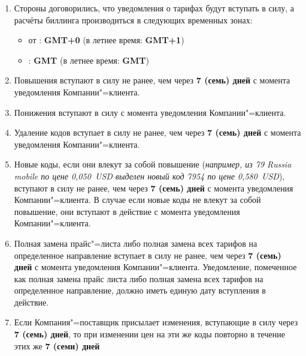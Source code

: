 \begin{Form}
  \begin{enumerate}[label=\thesection.\arabic*.]
    \item Стороны договорились, что уведомления о тарифах будут вступать в силу, а расчёты биллинга производиться в следующих временных зонах:
      \begin{itemize}
        \item от \textbf{\ipxpname}: \textbf{GMT+0} (в летнее время: \textbf{GMT+1})
        \item {}
                {\underline{\TextField[name=clntname,charsize=10pt,width=22em,height=1em,borderwidth=0, bordercolor={1 1 1}, default=Company name]{}}:}
                 \textbf{GMT}\underline{\TextField[name=clntgmt,charsize=10pt,width=3em,maxlen=3,height=1em,borderwidth=0,bordercolor={1 1 1}]{}}
         (в летнее время: \textbf{GMT}\underline{\TextField[name=clntgmtsummer,charsize=10pt,width=3em,maxlen=3,height=1em,borderwidth=0,bordercolor={1 1 1}]{}})
      \end{itemize}
    \item Повышения вступают в силу не ранее, чем через \textbf{7 (семь) дней} с момента уведомления Компании"=клиента.
    \item Понижения вступают в силу с момента уведомления Компании"=клиента.
    \item Удаление кодов вступает в силу не ранее, чем через \textbf{7 (семь) дней} с момента уведомления Компании"=клиента.
    \item Новые коды, если они влекут за собой повышение (\textit{например, из 79 Russia mobile по цене
          0,050~USD выделен новый код 7954 по цене 0,580~USD}), вступают в силу
          не ранее, чем через \textbf{7 (семь) дней} с момента уведомления Компании"=клиента.
          В случае если новые коды не влекут за собой повышение, они вступают в действие с момента уведомления Компании"=клиента.
    \item Полная замена прайс"=листа либо полная замена всех тарифов на определенное
          направление вступает в силу не ранее, чем через \textbf{7 (семь) дней} с момента уведомления
          Компании"=клиента. Уведомление, помеченное как полная замена прайс листа либо полная
          замена всех тарифов на определенное направление, должно иметь единую дату вступления в действие.
    \item Если Компания"=поставщик присылает изменения, вступающие в силу через \textbf{7 (семь) дней},
          то при изменении цен на эти же коды повторно в течение этих же \textbf{7 (семи) дней}

\end{enumerate}
\end{Form}
